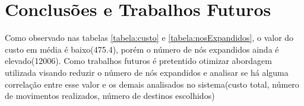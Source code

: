 \documentclass[12pt]{article}
\begin{document}
\section{Conclusões e Trabalhos Futuros} \label{sec:Conclusoes}
Como observado nas tabelas \ref{tabela:custo} e \ref{tabela:nosExpandidos}, o valor do custo em média é baixo(475.4), porém o número de nós expandidos ainda é elevado(12006). Como trabalhos futuros é pretentido otimizar abordagem utilizada visando reduzir o número de nós expandidos e analisar se há alguma correlação entre esse valor e os demais analisados no sistema(custo total, número de movimentos realizados, número de destinos escolhidos)


\end{document}
